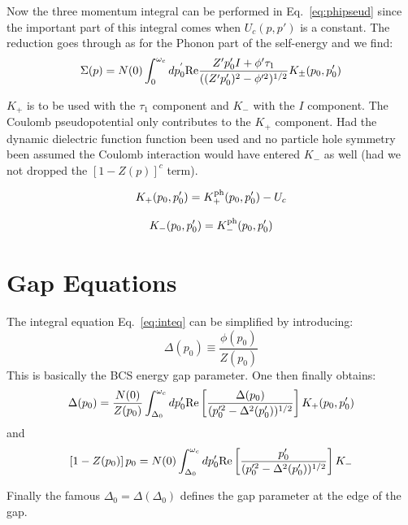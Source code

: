 \documentclass{article}
\begin{document}
Now the three momentum integral can be performed in Eq.~\ref{eq:phipseud} since the important
part of this integral comes when $U_{c}(p,p')$ is a constant. The reduction goes through as for the 
Phonon part of the self-energy and we find:
%
\begin{equation}
\label{eq:inteq}
\Sigma(p) = N(0) \int_{0}^{\omega_{c}}dp^{'}_{0} {\rm Re} \frac{Z'p_{0}'I + \phi'\tau_{1}}{((Z'p_{0}')^{2} - \phi'^{2})^{1/2}} K_{\pm}(p_{0}, p_{0}')
\end{equation}
%

$K_{+}$ is to be used with the $\tau_{1}$ component and $K_{-}$ with the $I$ component. The Coulomb pseudopotential only contributes
to the $K_{+}$ component. Had the dynamic dielectric function function been used and no particle hole symmetry been assumed the
Coulomb interaction would have entered $K_{-}$ as well (had we not dropped the $[1-Z(p)]^{c}$ term).

%
\begin{equation}
K_{+} (p_{0},p_{0}') = K _{+}^{\rm ph}(p_{0},p_{0}') - U_{c}
\end{equation}

\begin{equation}
K_{-} (p_{0},p_{0}') = K _{-}^{\rm ph}(p_{0},p_{0}') 
\end{equation}

\section{Gap Equations}
%
The integral equation Eq.~\ref{eq:inteq} can be simplified by introducing:
%
\begin{equation}
\Delta(p_{0}) \equiv \frac{\phi(p_{0})}{Z(p_{0})} 
\end{equation}
%
This is basically the BCS energy gap parameter. One then finally obtains:
%
\begin{equation}
\Delta(p_{0}) = \frac{N(0)}{Z(p_{0})} \int_{\Delta_{0}}^{\omega_{c}} d p_{0}' {\rm Re} \left[ 
\frac{\Delta(p_{0})}{(p_{0}'^{2} - \Delta^{2}(p_{0}'))^{1/2}} 
\right]K_{+}(p_{0}, p_{0}') 
\end{equation}
%
and
%
\begin{equation}
\left[ 1-Z(p_{0}) \right] p_{0} = N(0) \int_{\Delta_{0}}^{\omega_{c}}d p_{0}'
{\rm Re} \left[ \frac{p_{0}'}{(p_{0}'^{2} - \Delta^{2}(p_{0}'))^{1/2}}\right]K_{-}
\end{equation}

Finally the famous $\Delta_{0} = \Delta(\Delta_{0})$ defines the gap parameter at the edge
of the gap.
\end{document}
